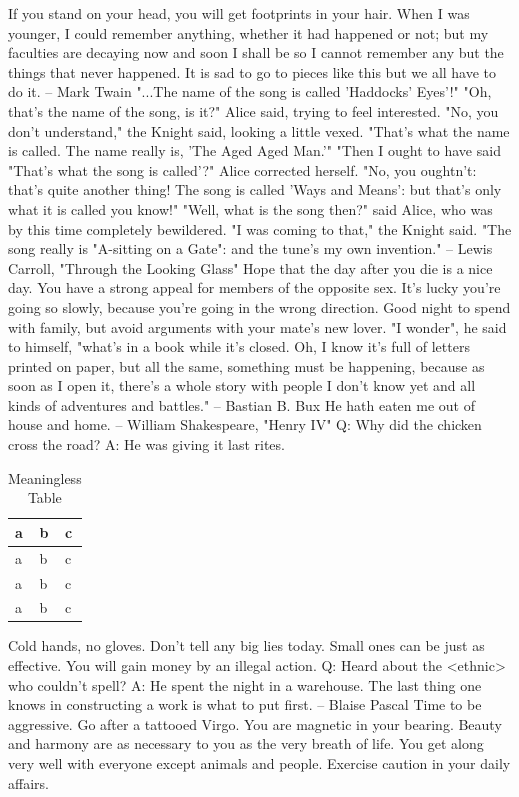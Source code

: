 If you stand on your head, you will get footprints in your hair.
When I was younger, I could remember anything, whether it had happened
or not; but my faculties are decaying now and soon I shall be so I
cannot remember any but the things that never happened.  It is sad to
go to pieces like this but we all have to do it.
		-- Mark Twain
	"...The name of the song is called 'Haddocks' Eyes'!"
	"Oh, that's the name of the song, is it?" Alice said, trying to
feel interested.
	"No, you don't understand," the Knight said, looking a little
vexed.  "That's what the name is called.  The name really is, 'The Aged
Aged Man.'"
	"Then I ought to have said "That's what the song is called'?"
Alice corrected herself.
	"No, you oughtn't: that's quite another thing!  The song is
called 'Ways and Means':  but that's only what it is called you know!"
	"Well, what is the song then?" said Alice, who was by this
time completely bewildered.
	"I was coming to that," the Knight said.  "The song really is
"A-sitting on a Gate": and the tune's my own invention."
		-- Lewis Carroll, "Through the Looking Glass"
Hope that the day after you die is a nice day.
You have a strong appeal for members of the opposite sex.
It's lucky you're going so slowly, because you're going in the wrong direction.
Good night to spend with family, but avoid arguments with your mate's
new lover.
"I wonder", he said to himself, "what's in a book while it's closed.  Oh, I
know it's full of letters printed on paper, but all the same, something must
be happening, because as soon as I open it, there's a whole story with people
I don't know yet and all kinds of adventures and battles."
		-- Bastian B. Bux
He hath eaten me out of house and home.
		-- William Shakespeare, "Henry IV"
Q:	Why did the chicken cross the road?
A:	He was giving it last rites.


\begin{table}[htb]
\caption{Meaningless Table}
\begin{center}
\begin{tabular}{lll} \hline
a & b & c \\ \hline
a & b & c \\
a & b & c \\
a & b & c \\ \hline
\end{tabular}
\end{center}
\end{table}

Cold hands, no gloves.
Don't tell any big lies today.  Small ones can be just as effective.
You will gain money by an illegal action.
Q:	Heard about the <ethnic> who couldn't spell?
A:	He spent the night in a warehouse.
The last thing one knows in constructing a work is what to put first.
		-- Blaise Pascal
Time to be aggressive.  Go after a tattooed Virgo.
You are magnetic in your bearing.
Beauty and harmony are as necessary to you as the very breath of life.
You get along very well with everyone except animals and people.
Exercise caution in your daily affairs.

